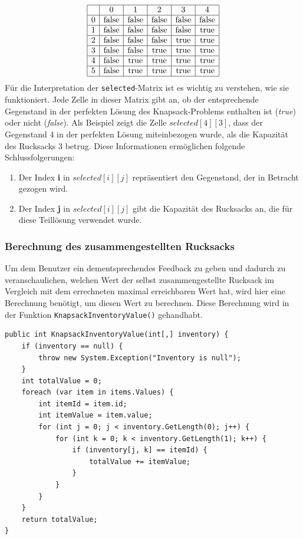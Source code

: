\[
\begin{array}{|c|c|c|c|c|c|}
\hline
& 0 & 1 & 2 & 3 & 4 \\
\hline
0 & \text{false} & \text{false} & \text{false} & \text{false} & \text{false} \\
\hline
1 & \text{false} & \text{false} & \text{false} & \text{false} & \text{true} \\
\hline
2 & \text{false} & \text{false} & \text{false} & \text{true} & \text{true} \\
\hline
3 & \text{false} & \text{false} & \text{true} & \text{true} & \text{true} \\
\hline
4 & \text{false} & \text{true} & \text{true} & \text{true} & \text{true} \\
\hline
5 & \text{false} & \text{true} & \text{true} & \text{true} & \text{true} \\
\hline
\end{array}
\]
Für die Interpretation der \texttt{selected}-Matrix ist es wichtig zu verstehen, wie sie funktioniert. Jede Zelle in dieser
Matrix gibt an, ob der entsprechende Gegenstand in der perfekten Lösung des Knapsack-Problems enthalten ist (\textit{true})
oder nicht (\textit{false}). Als Beispiel zeigt die Zelle $selected[4][3]$, dass der Gegenstand 4 in der perfekten Lösung
miteinbezogen wurde, als die Kapazität des Rucksacks 3 betrug. Diese Informationen ermöglichen folgende Schlussfolgerungen:
\begin{enumerate}
\item Der Index \textbf{i} in $selected[i][j]$ repräsentiert den Gegenstand, der in Betracht gezogen wird.
\item Der Index \textbf{j} in $selected[i][j]$ gibt die Kapazität des Rucksacks an, die für diese Teillösung verwendet
wurde.
\end{enumerate}

\subsubsection{Berechnung des zusammengestellten Rucksacks}
Um dem Benutzer ein dementsprechendes Feedback zu geben und dadurch zu veranschaulichen, welchen Wert der selbst
zusammengestellte Rucksack im Vergleich mit dem errechneten maximal erreichbaren Wert hat, wird hier eine Berechnung
benötigt, um diesen Wert zu berechnen. Diese Berechnung wird in der Funktion \texttt{KnapsackInventoryValue()} gehandhabt.
\begin{lstlisting}[style=csharp, caption={Funktion um eigenen Rucksack zu brechnen}]
public int KnapsackInventoryValue(int[,] inventory) {
    if (inventory == null) {
        throw new System.Exception("Inventory is null");
    }
    int totalValue = 0;
    foreach (var item in items.Values) {
        int itemId = item.id;
        int itemValue = item.value;
        for (int j = 0; j < inventory.GetLength(0); j++) {
            for (int k = 0; k < inventory.GetLength(1); k++) {
                if (inventory[j, k] == itemId) {
                    totalValue += itemValue;
                }
            }
        }
    }
    return totalValue;
}
\end{lstlisting}


